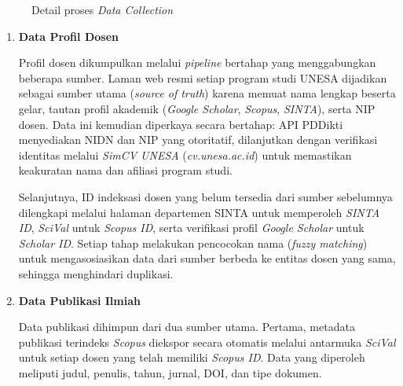 \begin{enumerate}[label=\textbf{\arabic*.}, leftmargin=*, itemsep=10pt]
\begin{figure}[htbp]
              \caption{Detail proses \textit{Data Collection}}
              \label{fig:detail-data-collection}
          \end{figure}

          \begin{enumerate}[label=\textbf{\alph*.}, leftmargin=0.75cm, itemsep=5pt]
              \item \textbf{Data Profil Dosen}

                    Profil dosen dikumpulkan melalui \textit{pipeline} bertahap yang menggabungkan beberapa sumber. Laman web resmi setiap program studi UNESA dijadikan sebagai sumber utama (\textit{source of truth}) karena memuat nama lengkap beserta gelar, tautan profil akademik (\textit{Google Scholar}, \textit{Scopus}, \textit{SINTA}), serta NIP dosen. Data ini kemudian diperkaya secara bertahap: API PDDikti \citep{pddikti_db} menyediakan NIDN dan NIP yang otoritatif, dilanjutkan dengan verifikasi identitas melalui \textit{SimCV UNESA} (\textit{cv.unesa.ac.id}) untuk memastikan keakuratan nama dan afiliasi program studi.

                    Selanjutnya, ID indeksasi dosen yang belum tersedia dari sumber sebelumnya dilengkapi melalui halaman departemen SINTA \citep{sinta_database} untuk memperoleh \textit{SINTA ID}, \textit{SciVal} \citep{scopus_db} untuk \textit{Scopus ID}, serta verifikasi profil \textit{Google Scholar} \citep{google_scholar} untuk \textit{Scholar ID}. Setiap tahap melakukan pencocokan nama (\textit{fuzzy matching}) untuk mengasosiasikan data dari sumber berbeda ke entitas dosen yang sama, sehingga menghindari duplikasi.

              \item \textbf{Data Publikasi Ilmiah}

                    Data publikasi dihimpun dari dua sumber utama. Pertama, metadata publikasi terindeks \textit{Scopus} diekspor secara otomatis melalui antarmuka \textit{SciVal} \citep{scopus_db} untuk setiap dosen yang telah memiliki \textit{Scopus ID}. Data yang diperoleh meliputi judul, penulis, tahun, jurnal, DOI, dan tipe dokumen.


\end{enumerate}
\end{enumerate}

